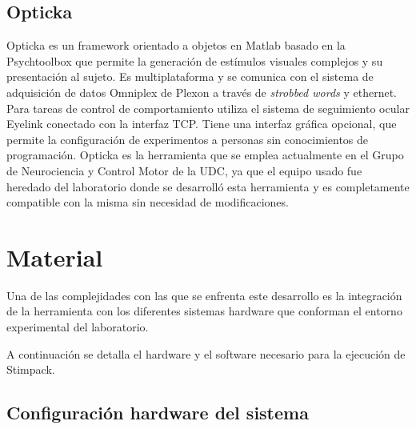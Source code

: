 \documentclass[conference]{IEEEtran}
\begin{document}
\subsection{Opticka}

Opticka\cite{opticka} es un framework orientado a objetos en Matlab basado en la Psychtoolbox que permite la generación de estímulos visuales complejos y su presentación al sujeto. Es multiplataforma y se comunica con el sistema de adquisición de datos Omniplex\cite{omniplex} de Plexon a través de \textit{strobbed words} y ethernet. Para tareas de control de comportamiento utiliza el sistema de seguimiento ocular Eyelink conectado con la interfaz TCP. 
Tiene una interfaz gráfica opcional, que permite la configuración de experimentos a personas sin conocimientos de programación.
Opticka es la herramienta que se emplea actualmente en el Grupo de Neurociencia y Control Motor de la UDC, ya que el equipo usado fue heredado del laboratorio donde se desarrolló esta herramienta y es completamente compatible con la misma sin necesidad de modificaciones.







\section{Material}

Una de las complejidades con las que se enfrenta este desarrollo es la integración de la herramienta con los diferentes sistemas hardware que conforman el entorno experimental del laboratorio.

A continuación se detalla el hardware y el software necesario para la ejecución de Stimpack.

\subsection{Configuración hardware del sistema}
\end{document}
